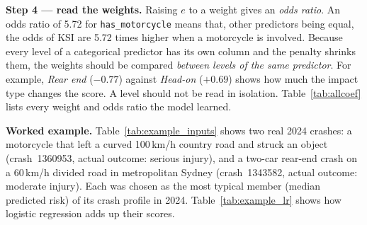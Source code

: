 \documentclass[11pt,a4paper]{article}
\begin{document}
\textbf{Step 4 --- read the weights.} Raising $e$ to a weight gives an \emph{odds ratio}. An odds ratio of 5.72 for
\texttt{has\_motorcycle} means that, other predictors being equal, the odds of KSI are 5.72 times higher when a motorcycle
is involved. Because every level of a categorical predictor has its own column and the penalty shrinks them, the
weights should be compared \emph{between levels of the same predictor}. For example, \emph{Rear end} ($-0.77$) against
\emph{Head-on} ($+0.69$) shows how much the impact type changes the score. A level should not be read in isolation.
Table~\ref{tab:allcoef} lists every weight and odds ratio the model learned.

\textbf{Worked example.} Table~\ref{tab:example_inputs} shows two real 2024 crashes: a motorcycle that left a curved
100\,km/h country road and struck an object (crash~1360953, actual outcome: serious injury), and a two-car
rear-end crash on a 60\,km/h divided road in metropolitan Sydney (crash~1343582, actual outcome: moderate injury).
Each was chosen as the most typical member (median predicted risk) of its crash profile in 2024.
Table~\ref{tab:example_lr} shows how logistic regression adds up their scores.
\end{document}
